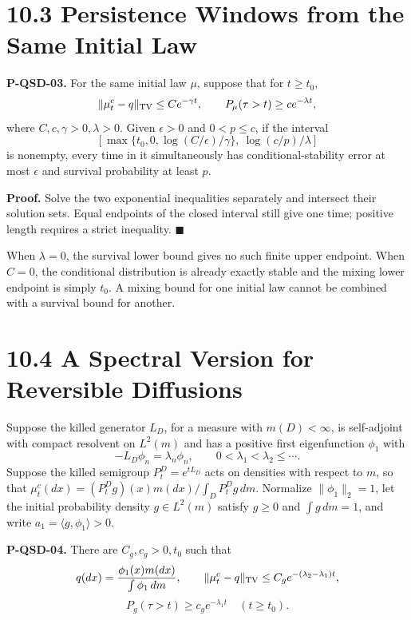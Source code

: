 \documentclass[
  english,
  11pt,
  oneside]{book}
\newcounter{none} %
\begin{document}
\section{10.3 Persistence Windows from the Same Initial Law}\label{persistence-windows-from-the-same-initial-law}

\hypertarget{p-qsd-03}{}\label{p-qsd-03}

\textbf{P-QSD-03.} For the same initial law \(\mu\), suppose that for \(t\ge t_0\), \[\|\mu_t^c-q\|_{\rm TV}\le Ce^{-\gamma t},\qquad
P_\mu(\tau>t)\ge ce^{-\lambda t},\] where \(C,c,\gamma>0,\lambda>0\). Given \(\epsilon>0\) and \(0<p\le c\), if the interval \[\left[\max\{t_0,0,\log(C/\epsilon)/\gamma\},
\ \log(c/p)/\lambda\right]\] is nonempty, every time in it simultaneously has conditional-stability error at most \(\epsilon\) and survival probability at least \(p\).

\textbf{Proof.} Solve the two exponential inequalities separately and intersect their solution sets. Equal endpoints of the closed interval still give one time; positive length requires a strict inequality. \(\blacksquare\)

When \(\lambda=0\), the survival lower bound gives no such finite upper endpoint. When \(C=0\), the conditional distribution is already exactly stable and the mixing lower endpoint is simply \(t_0\). A mixing bound for one initial law cannot be combined with a survival bound for another.

\section{10.4 A Spectral Version for Reversible Diffusions}\label{a-spectral-version-for-reversible-diffusions}

Suppose the killed generator \(L_D\), for a measure with \(m(D)<\infty\), is self-adjoint with compact resolvent on \(L^2(m)\) and has a positive first eigenfunction \(\phi_1\) with \[-L_D\phi_n=\lambda_n\phi_n,\qquad
0<\lambda_1<\lambda_2\le\cdots.\] Suppose the killed semigroup \(P_t^D=e^{tL_D}\) acts on densities with respect to \(m\), so that \(\mu_t^c(dx)=(P_t^Dg)(x)m(dx)/\int_DP_t^Dg\,dm\). Normalize \(\|\phi_1\|_2=1\), let the initial probability density \(g\in L^2(m)\) satisfy \(g\ge0\) and \(\int g\,dm=1\), and write \(a_1=\langle g,\phi_1\rangle>0\).

\hypertarget{p-qsd-04}{}\label{p-qsd-04}

\textbf{P-QSD-04.} There are \(C_g,c_g>0,t_0\) such that \[q(dx)=\frac{\phi_1(x)m(dx)}{\int\phi_1\,dm},\qquad
\|\mu_t^c-q\|_{\rm TV}\le C_ge^{-(\lambda_2-\lambda_1)t},\] \[P_g(\tau>t)\ge c_ge^{-\lambda_1t}\quad(t\ge t_0).\]
\end{document}
